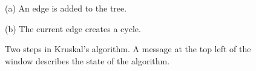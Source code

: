 \begin{figure}[p]

\begin{center}

(a) An edge is added to the tree.


(b) The current edge creates a cycle.

\end{center}

\caption{Two steps in Kruskal's algorithm. A message at the top left of the window describes the state of the algorithm.}

\label{fig:kruskal_pictures}
\end{figure}
